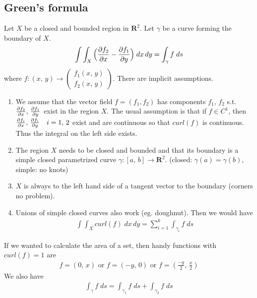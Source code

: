 \documentclass[8pt]{extarticle}
\newcommand{\R}{{\mathbb R}}
\newcommand{\X}{{\mathcal X}}
\newcommand{\ra}{{\rightarrow}}
\def\R{\mathbf{R}}
\def\X{X}
\begin{document}
\begin{multicols*}{3}
  \subsection{Green's formula}
  Let $\X$ be a closed and bounded region in $\R^2$.
  Let $\gamma$ be a curve forming the boundary of $\X$.
  \begin{align*}
    \int \int_\X \Big( \pdv{f_2}{x} - \pdv{f_1}{y} \Big) \; dx \, dy
    = \int_\gamma f \; ds
  \end{align*}
  where $f: (x, \, y) \ra \begin{pmatrix}
      f_1(x, \, y) \\
      f_2(x, \, y)
    \end{pmatrix}$.
  There are implicit assumptions.
  \begin{enumerate}[label=(\arabic*)]
    \item We assume that the vector field $f= (f_1, f_2)$ has components
          $f_1, \, f_2$ s.t. $\pdv{f_2}{x}, \, \pdv{f_1}{y}$ exist
          in the region $\X$. The usual assumption is that if $f \in C^1$,
          then $\pdv{f_i}{x}, \, \pdv{f_i}{y} \quad i = 1, \, 2$ exist and are continuous
          so that $curl(f)$ is continuous. Thus the integral on the left side exists.
    \item The region $\X$ needs to be closed and bounded and that its boundary
          is a simple closed parametrized curve $\gamma: [a, \, b] \ra \R^2$.
          (closed: $\gamma(a) = \gamma(b)$, simple: no knots)
    \item $\X$ is always to the left hand side of a tangent vector to the boundary
          (corners no problem).
    \item Unions of simple closed curves also work (eg. doughnut).
          Then we would have
          \begin{align*}
            \int \int_\X curl(f) \; dx \, dy = \sum_{i = 1}^k \int_{\gamma_i} f \; ds
          \end{align*}
  \end{enumerate}
  If we wanted to calculate the area of a set, then handy
  functions with $curl(f) = 1 $ are
  \begin{align*}
    f=(0, \, x) \text{ or } f = (-y, \, 0) \text{ or } f = \left(\frac{-y}{2},\,  \frac{x}{2}\right)
  \end{align*}
  We also have
  \begin{align*}
    \int_\gamma f \; ds = \int_{\gamma_1} f \; ds +\int_{\gamma_2} f \; ds
  \end{align*}

\end{multicols*}
\end{document}
